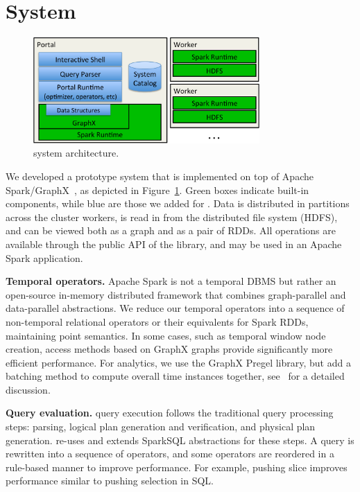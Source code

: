 \section{System}
\label{sec:sys}

\begin{figure}[t]
\centering
\includegraphics[width=3.4in]{figs/architecture.pdf}
\vspace{-0.4cm}
\caption{\sys system architecture.}
\vspace{-0.4cm}
\label{fig:arch}
\end{figure}

We developed a prototype system \sys that is implemented on top of
Apache Spark/GraphX~\cite{DBLP:conf/osdi/GonzalezXDCFS14}, as depicted
in Figure~\ref{fig:arch}.  Green boxes indicate built-in components,
while blue are those we added for \sys.  Data is distributed in
partitions across the cluster workers, is read in from the distributed
file system (HDFS), and can be viewed both as a graph and as a pair of
RDDs.  All \tg operations are available through the public API of the
\sys library, and may be used in an Apache Spark application.

{\bf Temporal operators.}  Apache Spark is not a temporal DBMS but
rather an open-source in-memory distributed framework that combines
graph-parallel and data-parallel abstractions.  We reduce our temporal
operators into a sequence of non-temporal relational operators or their
equivalents for Spark RDDs, maintaining point semantics.  In some
cases, such as temporal window node creation, access methods based on
GraphX graphs provide significantly more efficient performance.  For
analytics, we use the GraphX Pregel library, but add a batching method
to compute overall time instances together,
see~\cite{MoffittTempWeb16} for a detailed discussion.

{\bf Query evaluation.}  \sys query execution follows the traditional
query processing steps: parsing, logical plan generation and
verification, and physical plan generation. \sys re-uses and extends
SparkSQL abstractions for these steps.  A \ql query is rewritten into
a sequence of \tra operators, and some operators are reordered in a
rule-based manner to improve performance.  For example, pushing slice
improves performance similar to pushing selection in SQL.

